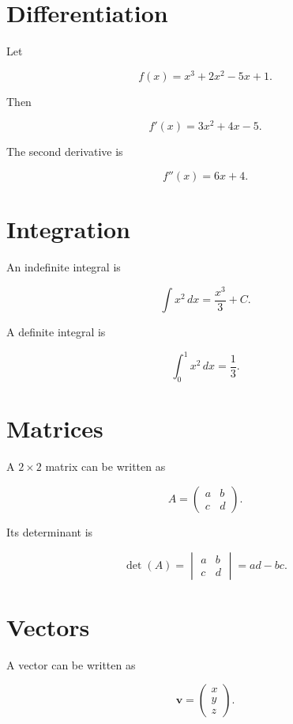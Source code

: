 \documentclass[12pt,a4paper]{article}
\begin{document}
\section{Differentiation}

Let

\[
f(x) = x^3 + 2x^2 - 5x + 1.
\]

Then

\[
f'(x)
=
3x^2 + 4x - 5.
\]

The second derivative is

\[
f''(x)
=
6x + 4.
\]

\section{Integration}

An indefinite integral is

\[
\int x^2\,dx
=
\frac{x^3}{3}+C.
\]

A definite integral is

\[
\int_0^1 x^2\,dx
=
\frac{1}{3}.
\]

\section{Matrices}

A \(2\times2\) matrix can be written as

\[
A =
\begin{pmatrix}
a & b \\
c & d
\end{pmatrix}.
\]

Its determinant is

\[
\det(A)
=
\begin{vmatrix}
a & b \\
c & d
\end{vmatrix}
=
ad-bc.
\]

\section{Vectors}

A vector can be written as

\[
\mathbf{v}
=
\begin{pmatrix}
x\\
y\\
z
\end{pmatrix}.
\]
\end{document}
